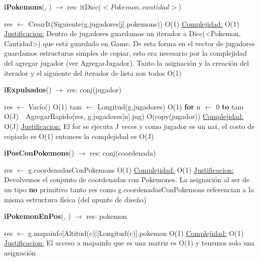 \begin{Algoritmos}
\begin{algorithm}[H]{\textbf{iPokemons}(, ) $\to$ res: itDicc($<Pokemon, cantidad>$)}
	\begin{algorithmic}[1]
		\State res $\gets$ CrearIt(Siguiente(g.jugadores[j].pokemons)) \Comment O(1)
		\medskip
		\Statex \underline{Complejidad:} O(1)
		\Statex \underline{Justificacion:} Dentro de jugadores guardamos un iterador a Dicc(<Pokemon, Cantidad>) que est\'a guardado en Game. De esta forma en el vector de jugadores guardamos estructuras simples de copiar, esto era necesario por la complejidad del agregar jugador (ver AgregarJugador). Tanto la asignaci\'on y la creaci\'on del iterador y el siguiente del iterador de lista son todos O(1)
	\end{algorithmic}
\end{algorithm}

\begin{algorithm}[H]{\textbf{iExpulsados}() $\to$ res: conj(jugador)}
	\begin{algorithmic}[1]
		\State res $\gets$ Vac\'io() \Comment O(1)
		\State tam $\gets$ Longitud(g.jugadores) \Comment O(1)
		\State \textbf{for} n $\gets$ 0 \textbf{to} tam \Comment O(J)
		\State \,\,\,\,AgregarRapido(res, g.jugadores[n].jug) \Comment O(copy(jugador))
		\medskip
		\Statex \underline{Complejidad:} O(J)
		\Statex \underline{Justificacion:} El for se ejecuta J veces y como jugador es un nat, el costo de copiarlo es O(1) entonces la complejidad es O(J)
	\end{algorithmic}
\end{algorithm}

\begin{algorithm}[H]{\textbf{iPosConPokemons}() $\to$ res: conj(coordenada)}
	\begin{algorithmic}[1]
		\State res $\gets$ g.coordenadasConPokemons \Comment O(1)
		\medskip
		\Statex \underline{Complejidad:} O(1)
		\Statex \underline{Justificacion:} Devolvemos el conjunto de coordenadas con Pokemones. La asignaci\'on al ser de un tipo \textbf{no} primitivo tanto res como g.coordenadasConPokemons referencian a la misma estructura f\'isica (del apunte de dise\~no)
	\end{algorithmic}
\end{algorithm}

\begin{algorithm}[H]{\textbf{iPokemonEnPos}(, ) $\to$ res: pokemon}
	\begin{algorithmic}[1]
		\State res $\gets$ g.mapainfo[Altitud(c)][Longitud(c)].pokemon \Comment O(1)
		\medskip
		\Statex \underline{Complejidad:} O(1)
		\Statex \underline{Justificacion:} El acceso a mapainfo que es una matriz es O(1) y tenemos solo una asignaci\'on
	\end{algorithmic}
\end{algorithm}


\end{Algoritmos}
